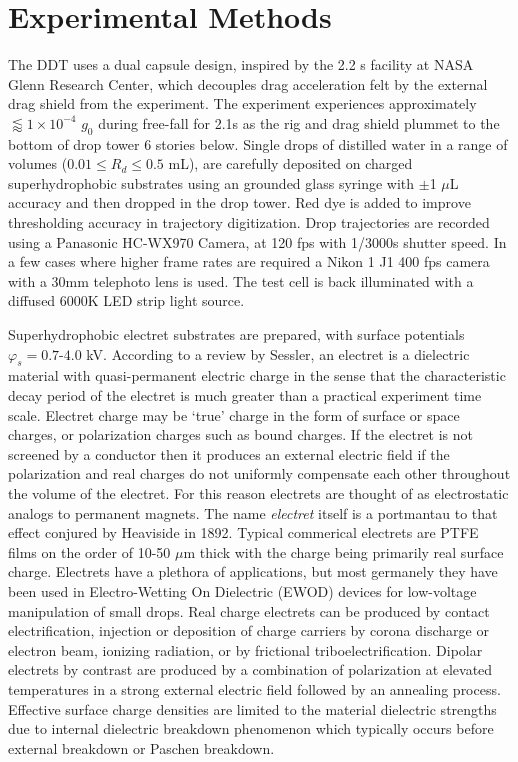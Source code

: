 \documentclass[12pt,a4paper,oneside]{book}
\begin{document}
\section{Experimental Methods}
The DDT uses a dual capsule design, inspired by the 2.2 s facility at NASA Glenn Research Center, which decouples drag acceleration felt by the external drag shield from the experiment. The experiment experiences approximately $\lessapprox 1 \times 10^{-4}$ $g_0$ during free-fall for 2.1s as the rig and drag shield plummet to the bottom of drop tower 6 stories below. Single drops of distilled water in a range of volumes ($0.01 \leq R_d \leq 0.5$ mL), are carefully deposited on charged superhydrophobic substrates using an grounded glass syringe with $\pm $1 $\mu$L accuracy and then dropped in the drop tower. Red dye is added to improve thresholding accuracy in trajectory digitization. Drop trajectories are recorded using a Panasonic HC-WX970 Camera, at 120 fps with 1/3000s shutter speed. In a few cases where higher frame rates are required a Nikon 1 J1 400 fps camera with a 30mm telephoto lens is used. The test cell is back illuminated with a diffused 6000K LED strip light source.  

Superhydrophobic electret substrates are prepared, with surface potentials $\varphi_s = 0.7$-$4.0$ kV. According to a review by Sessler\cite{sessler_electrets_1987}, an electret is a dielectric material with quasi-permanent electric charge in the sense that the characteristic decay period of the electret is much greater than a practical experiment time scale. Electret charge may be `true' charge in the form of surface or space charges, or polarization charges such as bound charges. If the electret is not screened by a conductor then it produces an external electric field if the polarization and real charges do not uniformly compensate each other throughout the volume of the electret. For this reason electrets are thought of as electrostatic analogs to permanent magnets. The name \emph{electret} itself is a portmantau to that effect conjured by Heaviside in 1892\cite{heaviside_electrical_2011}. Typical commerical electrets are PTFE films on the order of 10-50 $\mu$m thick with the charge being primarily real surface charge. Electrets have a plethora of applications, but most germanely they have been used in Electro-Wetting On Dielectric (EWOD) devices for low-voltage manipulation of small drops\cite{wu_low-voltage_2010}. Real charge electrets can be produced by contact electrification, injection or deposition of charge carriers by corona discharge or electron beam, ionizing radiation, or by frictional triboelectrification. Dipolar electrets by contrast are produced by a combination of polarization at elevated temperatures in a strong external electric field followed by an annealing process. Effective surface charge densities are limited to the material dielectric strengths due to internal dielectric breakdown phenomenon which typically occurs before external breakdown or Paschen breakdown. 
\end{document}
